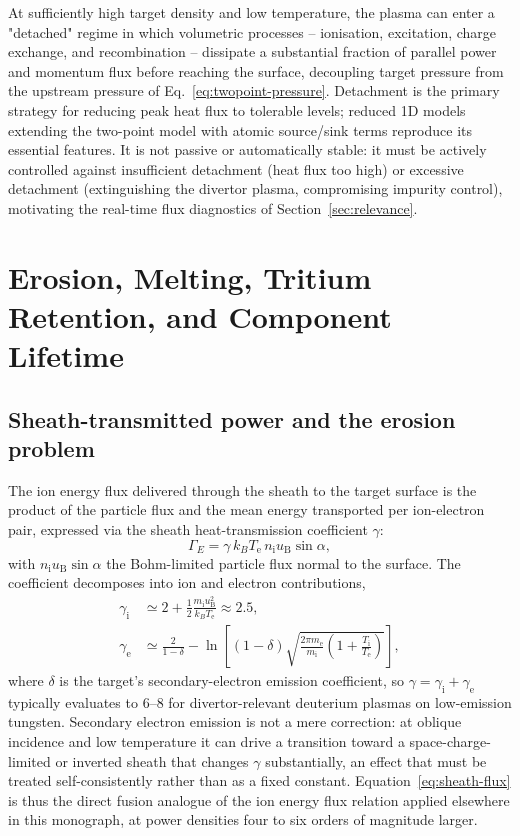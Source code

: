 At sufficiently high target density and low temperature, the plasma can enter a "detached" regime in which volumetric processes -- ionisation, excitation, charge exchange, and recombination -- dissipate a substantial fraction of parallel power and momentum flux before reaching the surface, decoupling target pressure from the upstream pressure of Eq.~\eqref{eq:twopoint-pressure}. Detachment is the primary strategy for reducing peak heat flux to tolerable levels; reduced 1D models extending the two-point model with atomic source/sink terms reproduce its essential features. It is not passive or automatically stable: it must be actively controlled against insufficient detachment (heat flux too high) or excessive detachment (extinguishing the divertor plasma, compromising impurity control), motivating the real-time flux diagnostics of Section~\ref{sec:relevance}.

\section{Erosion, Melting, Tritium Retention, and Component Lifetime}

\subsection{Sheath-transmitted power and the erosion problem}
\label{sec:sheath-heat}

The ion energy flux delivered through the sheath to the target surface is the product of the particle flux and the mean energy transported per ion-electron pair, expressed via the sheath heat-transmission coefficient $\gamma$:
\begin{equation}
\Gamma_{E} = \gamma\, k_{B} T_{\mathrm{e}}\, n_{\mathrm{i}} u_{\mathrm{B}} \sin\alpha,
\label{eq:sheath-flux}
\end{equation}
with $n_{\mathrm{i}} u_{\mathrm{B}}\sin\alpha$ the Bohm-limited particle flux normal to the surface. The coefficient decomposes into ion and electron contributions,
\begin{align}
\gamma_{\mathrm{i}} &\simeq 2 + \frac{1}{2}\frac{m_{\mathrm{i}} u_{\mathrm{B}}^{2}}{k_{B} T_{\mathrm{e}}} \approx 2.5, \\
\gamma_{\mathrm{e}} &\simeq \frac{2}{1-\delta} - \ln\!\left[(1-\delta)\sqrt{\frac{2\pi m_{\mathrm{e}}}{m_{\mathrm{i}}}\left(1+\frac{T_{\mathrm{i}}}{T_{\mathrm{e}}}\right)}\right],
\label{eq:fusion_gamma_e}
\end{align}
where $\delta$ is the target's secondary-electron emission coefficient, so $\gamma = \gamma_{\mathrm{i}} + \gamma_{\mathrm{e}}$ typically evaluates to $6$--$8$ for divertor-relevant deuterium plasmas on low-emission tungsten. Secondary electron emission is not a mere correction: at oblique incidence and low temperature it can drive a transition toward a space-charge-limited or inverted sheath that changes $\gamma$ substantially, an effect that must be treated self-consistently rather than as a fixed constant. Equation~\eqref{eq:sheath-flux} is thus the direct fusion analogue of the ion energy flux relation applied elsewhere in this monograph, at power densities four to six orders of magnitude larger.


